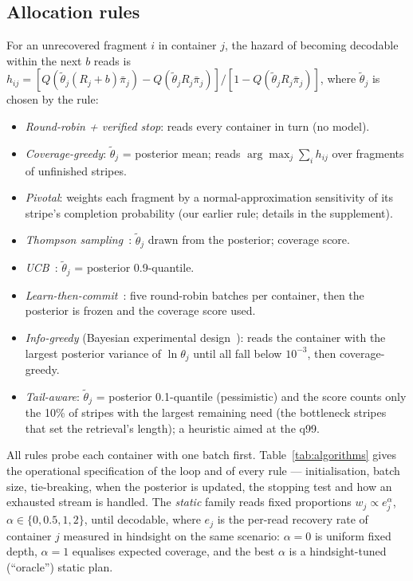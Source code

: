 \documentclass[conference,onecolumn,11pt]{IEEEtran}
\begin{document}
\subsection{Allocation rules}
For an unrecovered fragment $i$ in container $j$, the hazard of becoming decodable within the
next $b$ reads is
$h_{ij}=[Q(\tilde\theta_j(R_j{+}b)\bar\pi_j)-Q(\tilde\theta_jR_j\bar\pi_j)]/[1-Q(\tilde\theta_jR_j\bar\pi_j)]$,
where $\tilde\theta_j$ is chosen by the rule:
\begin{itemize}
\item \emph{Round-robin + verified stop}: reads every container in turn (no model).
\item \emph{Coverage-greedy}: $\tilde\theta_j$ = posterior mean; reads $\arg\max_j\sum_i h_{ij}$
over fragments of unfinished stripes.
\item \emph{Pivotal}: weights each fragment by a normal-approximation sensitivity of its
stripe's completion probability (our earlier rule; details in the supplement).
\item \emph{Thompson sampling}~\cite{thompson1933likelihood,russo2018tutorial}: $\tilde\theta_j$
drawn from the posterior; coverage score.
\item \emph{UCB}~\cite{auer2002finite}: $\tilde\theta_j$ = posterior 0.9-quantile.
\item \emph{Learn-then-commit}~\cite{garivier2016explore}: five round-robin batches per
container, then the posterior is frozen and the coverage score used.
\item \emph{Info-greedy} (Bayesian experimental design~\cite{chaloner1995bayesian}): reads the
container with the largest posterior variance of $\ln\theta_j$ until all fall below $10^{-3}$,
then coverage-greedy.
\item \emph{Tail-aware}: $\tilde\theta_j$ = posterior 0.1-quantile (pessimistic) and the score
counts only the 10\% of stripes with the largest remaining need (the bottleneck stripes that
set the retrieval's length); a heuristic aimed at the q99.
\end{itemize}
All rules probe each container with one batch first.  Table~\ref{tab:algorithms} gives the
operational specification of the loop and of every rule --- initialisation, batch size, tie-breaking,
when the posterior is updated, the stopping test and how an exhausted stream is handled.  The
\emph{static} family reads fixed
proportions $w_j\propto e_j^{\alpha}$, $\alpha\in\{0,0.5,1,2\}$, until decodable, where $e_j$ is
the per-read recovery rate of container $j$ measured in hindsight on the same scenario:
$\alpha{=}0$ is uniform fixed depth, $\alpha{=}1$ equalises expected coverage, and the best
$\alpha$ is a hindsight-tuned (``oracle'') static plan.
\end{document}
